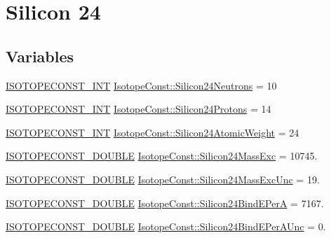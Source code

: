 \hypertarget{group___isotope_const-_silicon-_si24}{}\section{Silicon 24}
\label{group___isotope_const-_silicon-_si24}
\subsection*{Variables}
\begin{DoxyCompactItemize}
\item 
\mbox{\hyperlink{group___isotope_const-_macros_ga5f18360b3e99483a35c32d789e62621c}{I\+S\+O\+T\+O\+P\+E\+C\+O\+N\+S\+T\+\_\+\+I\+NT}} \mbox{\hyperlink{group___isotope_const-_silicon-_si24_ga58b30f53af67159cd1434151e5c86d25}{Isotope\+Const\+::\+Silicon24\+Neutrons}} = 10
\item 
\mbox{\hyperlink{group___isotope_const-_macros_ga5f18360b3e99483a35c32d789e62621c}{I\+S\+O\+T\+O\+P\+E\+C\+O\+N\+S\+T\+\_\+\+I\+NT}} \mbox{\hyperlink{group___isotope_const-_silicon-_si24_gacf5e22ce1834b519a31907c7f5547db1}{Isotope\+Const\+::\+Silicon24\+Protons}} = 14
\item 
\mbox{\hyperlink{group___isotope_const-_macros_ga5f18360b3e99483a35c32d789e62621c}{I\+S\+O\+T\+O\+P\+E\+C\+O\+N\+S\+T\+\_\+\+I\+NT}} \mbox{\hyperlink{group___isotope_const-_silicon-_si24_gab5df772d31bd0070e0a5b540f0d73e88}{Isotope\+Const\+::\+Silicon24\+Atomic\+Weight}} = 24
\item 
\mbox{\hyperlink{group___isotope_const-_macros_ga8f45a7272ce02c0b4c65c44636ed719a}{I\+S\+O\+T\+O\+P\+E\+C\+O\+N\+S\+T\+\_\+\+D\+O\+U\+B\+LE}} \mbox{\hyperlink{group___isotope_const-_silicon-_si24_ga348ed1d89e4aeec5119fdd97af4621a6}{Isotope\+Const\+::\+Silicon24\+Mass\+Exc}} = 10745.
\item 
\mbox{\hyperlink{group___isotope_const-_macros_ga8f45a7272ce02c0b4c65c44636ed719a}{I\+S\+O\+T\+O\+P\+E\+C\+O\+N\+S\+T\+\_\+\+D\+O\+U\+B\+LE}} \mbox{\hyperlink{group___isotope_const-_silicon-_si24_ga19de0d400c002123fb1a466bb3f7e94c}{Isotope\+Const\+::\+Silicon24\+Mass\+Exc\+Unc}} = 19.
\item 
\mbox{\hyperlink{group___isotope_const-_macros_ga8f45a7272ce02c0b4c65c44636ed719a}{I\+S\+O\+T\+O\+P\+E\+C\+O\+N\+S\+T\+\_\+\+D\+O\+U\+B\+LE}} \mbox{\hyperlink{group___isotope_const-_silicon-_si24_ga895c4daf17f1fc7602898ea395a4fe64}{Isotope\+Const\+::\+Silicon24\+Bind\+E\+PerA}} = 7167.
\item 
\mbox{\hyperlink{group___isotope_const-_macros_ga8f45a7272ce02c0b4c65c44636ed719a}{I\+S\+O\+T\+O\+P\+E\+C\+O\+N\+S\+T\+\_\+\+D\+O\+U\+B\+LE}} \mbox{\hyperlink{group___isotope_const-_silicon-_si24_gacd5f035df79a6edde42acceced926c34}{Isotope\+Const\+::\+Silicon24\+Bind\+E\+Per\+A\+Unc}} = 0.

\end{DoxyCompactItemize}
